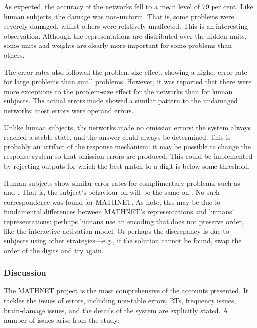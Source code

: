 As expected, the accuracy of the networks fell to a mean level of 79 per
cent.  Like human subjects, the damage was non-uniform.  That is, some
problems were severely damaged, whilst others were relatively unaffected.
This is an interesting observation.  Although the representations are
distributed over the hidden units, some units and weights are clearly more
important for some problems than others.

The error rates also followed the problem-size effect, showing a
higher error rate
for large problems than small problems.  However, it was reported that
there were more exceptions to the problem-size effect for
the networks than for human subjects.  The
actual errors made showed a similar pattern to the undamaged networks:
most errors were operand errors.

Unlike human subjects, the networks made no omission errors: the system
always reached a stable
state, and the answer could always be determined.
This is probably an artifact of the response mechanism:
it may be possible to change the response system so
that omission errors are produced. This could be implemented
by rejecting outputs for which
the best match to a digit is below some threshold.

Human subjects show similar error rates for complimentary problems, such
as  and .  That is, the subject's behaviour on  will be the
same on .  No such correspondence was found for MATHNET\@. As
\citeauthor{mcclmath} note, this may be due to fundamental differences
between MATHNET's representations and humans' representations: perhaps
humans use an encoding that does not preserve order, like the interactive
activation model.  Or perhaps the discrepancy is due to subjects
using other strategies---e.g., if the solution cannot be found, swap the
order of the digits and try again.

\subsubsection{Discussion}

The MATHNET project is the most comprehensive of the accounts presented. It
tackles the issues of errors, including non-table errors, RTs, frequency
issues, brain-damage issues, and the details of the system are explicitly
stated.  A number of issues arise from the study:

